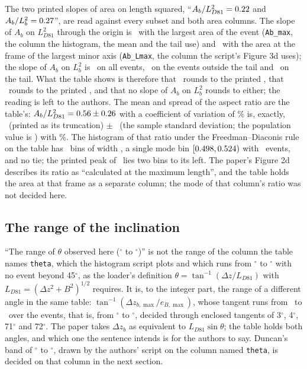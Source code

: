 \documentclass[preprint,11pt,authoryear]{elsarticle}
\begin{document}
The two printed slopes of area on length squared, ``$A_b/L_{D81}^2 = 0.22$ and $A_b/L_b^2 = 0.27$'', are read against every subset and both area columns. The slope of $A_b$ on $L_{D81}^2$ through the origin is \FitAbLDAll\ with the largest area of the event (\texttt{Ab\_max}, the column the histogram, the mean and the tail use) and \FitAbLDLmax\ with the area at the frame of the largest minor axis (\texttt{Ab\_Lmax}, the column the script's Figure 3d uses); the slope of $A_b$ on $L_b^2$ is \FitAbLbAll\ on all events, \FitAbLbRest\ on the events outside the tail and \FitAbLbTail\ on the tail. What the table shows is therefore that \FitAbLDLmax\ rounds to the printed \FitAbLDPrinted, that \FitAbLDAll\ rounds to the printed \FitAbLbPrinted, and that no slope of $A_b$ on $L_b^2$ rounds to either; the reading is left to the authors. The mean and spread of the aspect ratio are the table's: $A_b/L_{D81}^2 = 0.56 \pm 0.26$ with a coefficient of variation of \AspectCVPrinted\% is, exactly, \AspectMeanExact\ (printed as its truncation) $\pm$ \AspectSdExact\ (the sample standard deviation; the population value is \AspectSdPop) with \AspectCVExact\%. The histogram of that ratio under the Freedman--Diaconis rule on the table has \AspectPeakBins\ bins of width \AspectPeakWidth, a single mode bin $[0.498, 0.524)$ with \AspectPeakCount\ events, and no tie; the printed peak of \AspectPeakPrinted\ lies two bins to its left. The paper's Figure 2d describes its ratio as ``calculated at the maximum length'', and the table holds the area at that frame as a separate column; the mode of that column's ratio was not decided here.

\subsection{The range of the inclination}
``The range of $\theta$ observed here (\ThetaPrintedLo$^\circ$ to \ThetaPrintedHi$^\circ$)'' is not the range of the column the table names \texttt{theta}, which the histogram script plots and which runs from \ThetaColMin$^\circ$ to \ThetaColMax$^\circ$ with no event beyond 45$^\circ$, as the loader's definition $\theta = \tan^{-1}(\Delta z / L_{D81})$ with $L_{D81} = (\Delta z^2 + B^2)^{1/2}$ requires. It is, to the integer part, the range of a different angle in the same table: $\tan^{-1}(\Delta z_{b,\max} / e_{B,\max})$, whose tangent runs from \ThetaAltTanLo\ to \ThetaAltTanHi\ over the events, that is, from \ThetaAltDegLo$^\circ$ to \ThetaAltDegHi$^\circ$, decided through enclosed tangents of 3$^\circ$, 4$^\circ$, 71$^\circ$ and 72$^\circ$. The paper takes $\Delta z_b$ as equivalent to $L_{D81} \sin\theta$; the table holds both angles, and which one the sentence intends is for the authors to say. Duncan's band of \DuncanAngleLo$^\circ$ to \DuncanAngleHi$^\circ$, drawn by the authors' script on the column named \texttt{theta}, is decided on that column in the next section.
\end{document}
